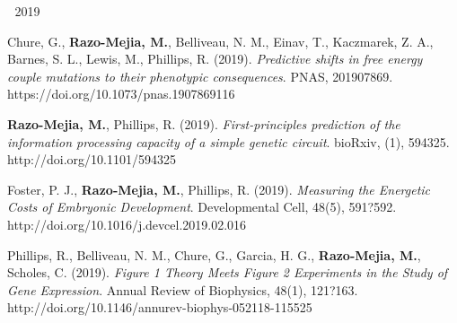 
\begin{cventries}

  \cventry
    {$\;$}
    {2019}
    {$\;$}
    {$\;$}
    {
      \begin{cvitems} %
        \item {
        \begin{flushleft}
          Chure, G., \textbf{Razo-Mejia, M.}, Belliveau, N. M., Einav, T.,
          Kaczmarek, Z. A., Barnes, S. L., Lewis, M., Phillips, R. (2019).
          \textit{Predictive shifts in free energy couple mutations to their
          phenotypic consequences}. PNAS, 201907869. \linebreak
          https://doi.org/10.1073/pnas.1907869116
        \end{flushleft}
        }
        \item {
          \begin{flushleft}
            \textbf{Razo-Mejia, M.}, Phillips, R. (2019).
            \textit{First-principles prediction of the information processing
            capacity of a simple genetic circuit}. bioRxiv, (1),
            594325. \linebreak
            http://doi.org/10.1101/594325
          \end{flushleft}
        }
        \item {
          \begin{flushleft}
            Foster, P. J., \textbf{Razo-Mejia, M.}, Phillips, R. (2019).
            \textit{Measuring the Energetic Costs of Embryonic Development}.
            Developmental Cell, 48(5), 591?592.\linebreak
            http://doi.org/10.1016/j.devcel.2019.02.016
          \end{flushleft}
        }
        \item {
          \begin{flushleft}
            Phillips, R., Belliveau, N. M., Chure, G., Garcia, H. G.,
            \textbf{Razo-Mejia, M.}, Scholes, C. (2019). \textit{Figure 1
            Theory Meets Figure 2 Experiments in the Study of Gene Expression}.
            Annual Review of Biophysics, 48(1), 121?163.\linebreak
            http://doi.org/10.1146/annurev-biophys-052118-115525
          \end{flushleft}
        }
      \end{cvitems}
    }


\end{cventries}
